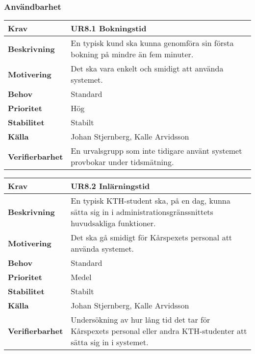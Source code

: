 \documentclass[a4paper, twoside, 11pt, titlepage]{article}
\begin{document}
		\subsubsection{Användbarhet}


		\begin {table} [ht] \begin{tabular} { p{2.6cm} p{12.5cm} }
			\hline
			{\sffamily\textbf{Krav}} & {\sffamily\textbf{UR8.1 Bokningstid}} \\
			\hline
			{\sffamily\textbf{Beskrivning}} & {En typisk kund ska kunna genomföra sin första bokning på mindre än fem minuter.} \\
			\hline
			{\sffamily\textbf{Motivering}} & {Det ska vara enkelt och smidigt att använda systemet.} \\
			\hline
			{\sffamily\textbf{Behov}} & {Standard} \\
			\hline
			{\sffamily\textbf{Prioritet}} & {Hög} \\
			\hline
			{\sffamily\textbf{Stabilitet}} & {Stabilt} \\
			\hline
			{\sffamily\textbf{Källa}} & {Johan Stjernberg, Kalle Arvidsson} \\
			\hline
			{\sffamily\textbf{Verifierbarhet}} & {En urvalsgrupp som inte tidigare använt systemet provbokar under tidsmätning.} \\
			\hline
		\end{tabular} \end{table} \FloatBarrier
		\vspace{6mm}

		\begin {table} [ht] \begin{tabular} { p{2.6cm} p{12.5cm} }
			\hline
			{\sffamily\textbf{Krav}} & {\sffamily\textbf{UR8.2 Inlärningstid}} \\
			\hline
			{\sffamily\textbf{Beskrivning}} & {En typisk KTH-student ska, på en dag, kunna sätta sig in i administrationsgränssnittets huvudsakliga funktioner.} \\
			\hline
			{\sffamily\textbf{Motivering}} & {Det ska gå smidigt för Kårspexets personal att använda systemet.} \\
			\hline
			{\sffamily\textbf{Behov}} & {Standard} \\
			\hline
			{\sffamily\textbf{Prioritet}} & {Medel} \\
			\hline
			{\sffamily\textbf{Stabilitet}} & {Stabilt} \\
			\hline
			{\sffamily\textbf{Källa}} & {Johan Stjernberg, Kalle Arvidsson} \\
			\hline
			{\sffamily\textbf{Verifierbarhet}} & {Undersökning av hur lång tid det tar för Kårspexets personal eller andra KTH-studenter att sätta sig in i systemet.} \\
			\hline
		\end{tabular} \end{table} \FloatBarrier
		\vspace{6mm}
\end{document}
